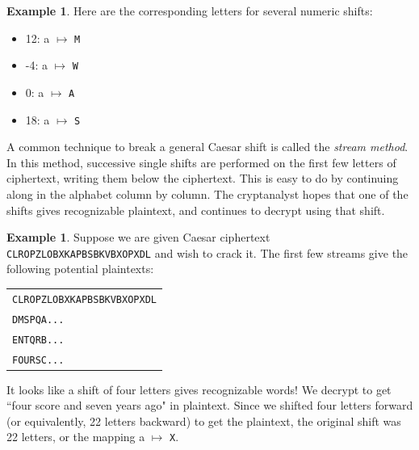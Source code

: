 \documentclass{book}
\theoremstyle{plain}
\theoremstyle{definition}
\newtheorem{example}[theorem]{Example}
\newcommand{\ciphertext}[1]{\texttt{#1}} %
\begin{document}
\begin{example}
Here are the corresponding letters for several numeric shifts:
\begin{itemize}
\item 12: a $\mapsto$ \ciphertext{M}
\item -4: a $\mapsto$ \ciphertext{W}
\item 0: a $\mapsto$ \ciphertext{A}
\item 18: a $\mapsto$ \ciphertext{S}
\end{itemize}
\end{example}

A common technique to break a general Caesar shift is called the {\it stream method}. In this method, successive single shifts are performed on the first few letters of ciphertext, writing them below the ciphertext. This is easy to do by continuing along in the alphabet column by column. The cryptanalyst hopes that one of the shifts gives recognizable plaintext, and continues to decrypt using that shift.

\begin{example}
Suppose we are given Caesar ciphertext \ciphertext{CLROPZLOBXKAPBSBKVBXOPXDL} and wish to crack it. The first few streams give the following potential plaintexts:

\begin{center}
\begin{tabular}{l}
\ciphertext{CLROPZLOBXKAPBSBKVBXOPXDL} \\
\ciphertext{DMSPQA...} \\
\ciphertext{ENTQRB...} \\
\ciphertext{FOURSC...}
\end{tabular}
\end{center}

It looks like a shift of four letters gives recognizable words! We decrypt to get ``four score and seven years ago" in plaintext. Since we shifted four letters forward (or equivalently, 22 letters backward) to get the plaintext, the original shift was 22 letters, or the mapping a $\mapsto$ \ciphertext{X}.
\end{example}
\end{document}
